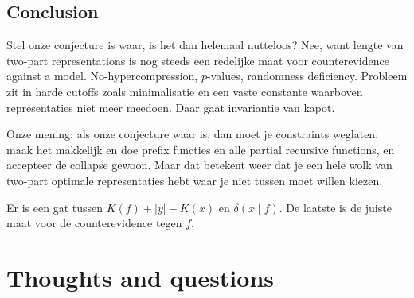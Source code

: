 \documentclass{style/llncs}
\begin{document}
\subsection{Conclusion}
Stel onze conjecture is waar, is het dan helemaal nutteloos? Nee, want lengte van two-part representations is nog steeds een redelijke maat voor counterevidence against a model. No-hypercompression, $p$-values, randomness deficiency. Probleem zit in harde cutoffs zoals minimalisatie en een vaste constante waarboven representaties niet meer meedoen. Daar gaat invariantie van kapot.

Onze mening: als onze conjecture waar is, dan moet je constraints weglaten: maak het makkelijk en doe prefix functies en alle partial recursive functions, en accepteer de collapse gewoon. Maar dat betekent weer dat je een hele wolk van two-part optimale representaties hebt waar je niet tussen moet willen kiezen.

Er is een gat tussen $K(f)+|y|-K(x)$ en $\delta(x\mid f)$. De laatste is de juiste maat voor de counterevidence tegen $f$.

\section{Thoughts and questions}
\end{document}
